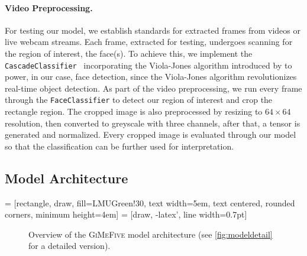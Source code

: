 \paragraph{Video Preprocessing.}
For testing our model, we establish standards for extracted frames from videos or live webcam streams. 
Each frame, extracted for testing, undergoes scanning for the region of interest, the face(s). 
To achieve this, 
we implement the \texttt{CascadeClassifier}~\cite{casc_class} incorporating the Viola-Jones algorithm introduced by \citet{990517} to power, 
in our case, face detection, 
since the Viola-Jones algorithm revolutionizes real-time object detection. 
As part of the video preprocessing, 
we run every frame through the \texttt{FaceClassifier} to detect our region of interest and crop the rectangle region. 
The cropped image is also preprocessed by resizing to $64 \times 64$ resolution, 
then converted to greyscale with three channels, 
after that, a tensor is generated and normalized. 
Every cropped image is evaluated through our model so that the classification can be further used for interpretation. 

\subsection{Model Architecture}
\label{sec:setup:model}

 = [rectangle, draw, fill=LMUGreen!30, text width=5em, text centered, rounded corners, minimum height=4em]
 = [draw, -latex', line width=0.7pt]

\begin{figure}[ht]
  \centering
  \caption{Overview of the \textsc{GiMeFive} model architecture 
  (see \cref{fig:modeldetail} for a detailed version).} 
  \label{fig:model}
\end{figure}

